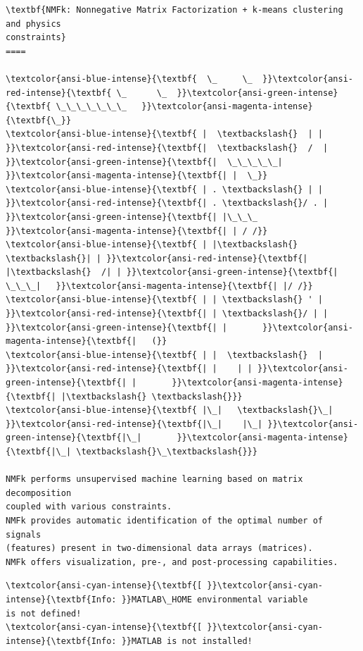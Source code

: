 \documentclass[11pt]{article}
\begin{document}
    \begin{Verbatim}[commandchars=\\\{\}]
\textbf{NMFk: Nonnegative Matrix Factorization + k-means clustering and physics
constraints}
====

\textcolor{ansi-blue-intense}{\textbf{  \_     \_  }}\textcolor{ansi-red-intense}{\textbf{ \_      \_  }}\textcolor{ansi-green-intense}{\textbf{ \_\_\_\_\_\_\_   }}\textcolor{ansi-magenta-intense}{\textbf{\_}}
\textcolor{ansi-blue-intense}{\textbf{ |  \textbackslash{}  | | }}\textcolor{ansi-red-intense}{\textbf{|  \textbackslash{}  /  | }}\textcolor{ansi-green-intense}{\textbf{|  \_\_\_\_\_| }}\textcolor{ansi-magenta-intense}{\textbf{| |  \_}}
\textcolor{ansi-blue-intense}{\textbf{ | . \textbackslash{} | | }}\textcolor{ansi-red-intense}{\textbf{| . \textbackslash{}/ . | }}\textcolor{ansi-green-intense}{\textbf{| |\_\_\_    }}\textcolor{ansi-magenta-intense}{\textbf{| | / /}}
\textcolor{ansi-blue-intense}{\textbf{ | |\textbackslash{} \textbackslash{}| | }}\textcolor{ansi-red-intense}{\textbf{| |\textbackslash{}  /| | }}\textcolor{ansi-green-intense}{\textbf{|  \_\_\_|   }}\textcolor{ansi-magenta-intense}{\textbf{| |/ /}}
\textcolor{ansi-blue-intense}{\textbf{ | | \textbackslash{} ' | }}\textcolor{ansi-red-intense}{\textbf{| | \textbackslash{}/ | | }}\textcolor{ansi-green-intense}{\textbf{| |       }}\textcolor{ansi-magenta-intense}{\textbf{|   (}}
\textcolor{ansi-blue-intense}{\textbf{ | |  \textbackslash{}  | }}\textcolor{ansi-red-intense}{\textbf{| |    | | }}\textcolor{ansi-green-intense}{\textbf{| |       }}\textcolor{ansi-magenta-intense}{\textbf{| |\textbackslash{} \textbackslash{}}}
\textcolor{ansi-blue-intense}{\textbf{ |\_|   \textbackslash{}\_| }}\textcolor{ansi-red-intense}{\textbf{|\_|    |\_| }}\textcolor{ansi-green-intense}{\textbf{|\_|       }}\textcolor{ansi-magenta-intense}{\textbf{|\_| \textbackslash{}\_\textbackslash{}}}

NMFk performs unsupervised machine learning based on matrix decomposition
coupled with various constraints.
NMFk provides automatic identification of the optimal number of signals
(features) present in two-dimensional data arrays (matrices).
NMFk offers visualization, pre-, and post-processing capabilities.
    \end{Verbatim}

    \begin{Verbatim}[commandchars=\\\{\}]
\textcolor{ansi-cyan-intense}{\textbf{[ }}\textcolor{ansi-cyan-intense}{\textbf{Info: }}MATLAB\_HOME environmental variable
is not defined!
\textcolor{ansi-cyan-intense}{\textbf{[ }}\textcolor{ansi-cyan-intense}{\textbf{Info: }}MATLAB is not installed!
    \end{Verbatim}
\end{document}
